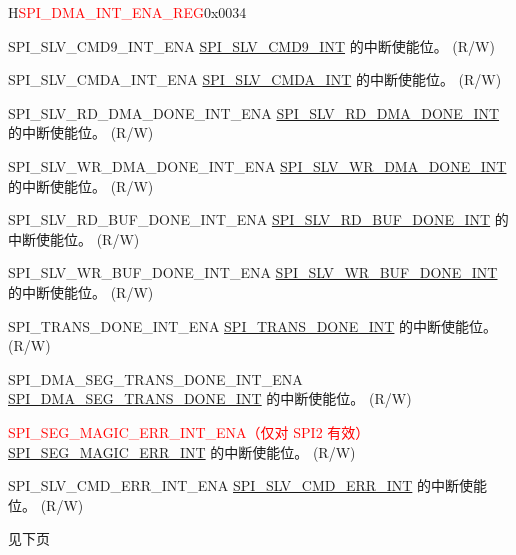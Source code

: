 \begin{register}{H}{\textcolor{red}{SPI\_DMA\_INT\_ENA\_REG}}{0x{}0034}
\begin{regdesc}
\begin{reglist}
\label{fielddesc:SPISLVCMD9INTENA}\item [SPI\_SLV\_CMD9\_INT\_ENA] \hyperref[int:SPISLVCMD9INT]{SPI\_SLV\_CMD9\_INT} 的中断使能位。 (R/W)
\label{fielddesc:SPISLVCMDAINTENA}\item [SPI\_SLV\_CMDA\_INT\_ENA] \hyperref[int:SPISLVCMDAINT]{SPI\_SLV\_CMDA\_INT} 的中断使能位。 (R/W)
\label{fielddesc:SPISLVRDDMADONEINTENA}\item [SPI\_SLV\_RD\_DMA\_DONE\_INT\_ENA] \hyperref[int:SPISLVRDDMADONEINT]{SPI\_SLV\_RD\_DMA\_DONE\_INT} 的中断使能位。 (R/W)
\label{fielddesc:SPISLVWRDMADONEINTENA}\item [SPI\_SLV\_WR\_DMA\_DONE\_INT\_ENA] \hyperref[int:SPISLVWRDMADONEINT]{SPI\_SLV\_WR\_DMA\_DONE\_INT} 的中断使能位。 (R/W)
\label{fielddesc:SPISLVRDBUFDONEINTENA}\item [SPI\_SLV\_RD\_BUF\_DONE\_INT\_ENA] \hyperref[int:SPISLVRDBUFDONEINT]{SPI\_SLV\_RD\_BUF\_DONE\_INT} 的中断使能位。 (R/W)
\label{fielddesc:SPISLVWRBUFDONEINTENA}\item [SPI\_SLV\_WR\_BUF\_DONE\_INT\_ENA] \hyperref[int:SPISLVWRBUFDONEINT]{SPI\_SLV\_WR\_BUF\_DONE\_INT} 的中断使能位。 (R/W)
\label{fielddesc:SPITRANSDONEINTENA}\item [SPI\_TRANS\_DONE\_INT\_ENA] \hyperref[int:SPITRANSDONEINT]{SPI\_TRANS\_DONE\_INT} 的中断使能位。 (R/W)
\label{fielddesc:SPIDMASEGTRANSDONEINTENA}\item [SPI\_DMA\_SEG\_TRANS\_DONE\_INT\_ENA] \hyperref[int:SPIDMASEGTRANSDONEINT]{SPI\_DMA\_SEG\_TRANS\_DONE\_INT} 的中断使能位。 (R/W)
\label{fielddesc:SPISEGMAGICERRINTENA}\item [\textcolor{red}{SPI\_SEG\_MAGIC\_ERR\_INT\_ENA（仅对 SPI2 有效）}] \hyperref[int:SPISEGMAGICERRINT]{SPI\_SEG\_MAGIC\_ERR\_INT} 的中断使能位。 (R/W)
\label{fielddesc:SPISLVCMDERRINTENA}\item [SPI\_SLV\_CMD\_ERR\_INT\_ENA] \hyperref[int:SPISLVCMDERRINT]{SPI\_SLV\_CMD\_ERR\_INT} 的中断使能位。 (R/W)

\item [见下页]
\end{reglist}\end{regdesc}
\end{register}

